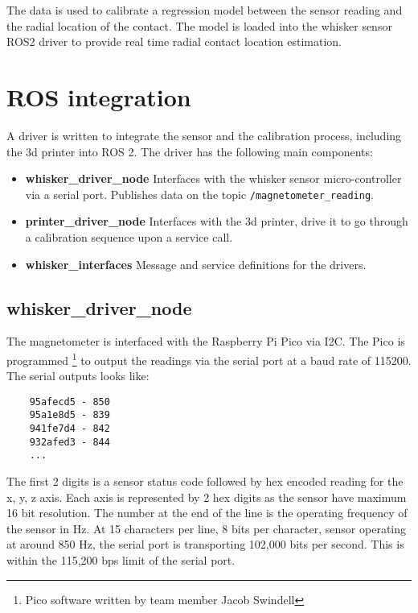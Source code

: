 \documentclass[runningheads]{llncs}
\begin{document}
The data is used to calibrate a regression model between the sensor reading and the radial location of the contact. The model is loaded into the whisker sensor ROS2 driver to provide real time radial contact location estimation.

\vspace{20px}



\section{ROS integration}

A driver is written to integrate the sensor and the calibration process, including the 3d printer into ROS 2. The driver has the following main components:

\begin{itemize}
    \item \textbf{whisker\_driver\_node} Interfaces with the whisker sensor micro-controller via a serial port. Publishes data on the topic \verb|/magnetometer_reading|.
    \item  \textbf{printer\_driver\_node} Interfaces with the 3d printer, drive it to go through a calibration sequence upon a service call.
    \item \textbf{whisker\_interfaces} Message and service definitions for the drivers.
\end{itemize}

\subsection{whisker\_driver\_node}

The magnetometer is interfaced with the Raspberry Pi Pico via I2C. The Pico is programmed \footnote{Pico software written by team member Jacob Swindell} to output the readings via the serial port at a baud rate of 115200. The serial outputs looks like:
\begin{verbatim}
    95afecd5 - 850
    95a1e8d5 - 839
    941fe7d4 - 842
    932afed3 - 844
    ...
\end{verbatim}

The first 2 digits is a sensor status code followed by hex encoded reading for the x, y, z axis. Each axis is represented by 2 hex digits as the sensor have maximum 16 bit resolution. The number at the end of the line is the operating frequency of the sensor in Hz. At 15 characters per line, 8 bits per character, sensor operating at around 850 Hz, the serial port is transporting 102,000 bits per second. This is within the 115,200 bps limit of the serial port.
\end{document}
